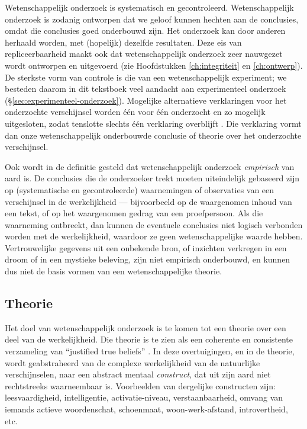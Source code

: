 \documentclass[
]{book}
\begin{document}
Wetenschappelijk onderzoek is systematisch en gecontroleerd.
Wetenschappelijk onderzoek is zodanig ontworpen dat we geloof kunnen
hechten aan de conclusies, omdat die conclusies goed onderbouwd zijn.
Het onderzoek kan door anderen herhaald worden, met (hopelijk) dezelfde
resultaten. Deze eis van repliceerbaarheid maakt ook dat
wetenschappelijk onderzoek zeer nauwgezet wordt ontworpen en uitgevoerd
(zie Hoofdstukken \ref{ch:integriteit} en \ref{ch:ontwerp}). De sterkste vorm van controle is die van een
wetenschappelijk experiment; we besteden daarom in dit tekstboek veel
aandacht aan experimenteel onderzoek (§\ref{sec:experimenteel-onderzoek}). Mogelijke alternatieve
verklaringen voor het onderzochte verschijnsel worden één voor één
onderzocht en zo mogelijk uitgesloten, zodat tenslotte slechts één
verklaring overblijft \citep{KL00}. Die verklaring vormt dan onze
wetenschappelijk onderbouwde conclusie of theorie over het onderzochte
verschijnsel.

Ook wordt in de definitie gesteld dat wetenschappelijk onderzoek
\emph{empirisch} van aard is. De conclusies die de onderzoeker trekt moeten
uiteindelijk gebaseerd zijn op (systematische en gecontroleerde)
waarnemingen of observaties van een verschijnsel in de werkelijkheid --- bijvoorbeeld op de waargenomen inhoud van een tekst, of op het
waargenomen gedrag van een proefpersoon. Als die waarneming ontbreekt,
dan kunnen de eventuele conclusies niet logisch verbonden worden met de werkelijkheid, waardoor ze geen wetenschappelijke waarde hebben.
Vertrouwelijke gegevens uit een onbekende bron, of inzichten verkregen
in een droom of in een mystieke beleving, zijn niet empirisch
onderbouwd, en kunnen dus niet de basis vormen van een wetenschappelijke theorie.

\hypertarget{sec:theorie}{%
\subsection{Theorie}\label{sec:theorie}}

Het doel van wetenschappelijk
onderzoek is te komen tot een theorie over een deel van de
werkelijkheid. Die theorie is te zien als een coherente en consistente
verzameling van ``justified true beliefs'' \citep{Mort03}. In deze
overtuigingen, en in de theorie, wordt geabstraheerd van de complexe
werkelijkheid van de natuurlijke verschijnselen, naar een abstract
mentaal \emph{construct}, dat uit zijn aard niet rechtstreeks waarneembaar
is. Voorbeelden van dergelijke constructen zijn: leesvaardigheid,
intelligentie, activatie-niveau, verstaanbaarheid, omvang van iemands
actieve woordenschat, schoenmaat, woon-werk-afstand, introvertheid, etc.
\end{document}
